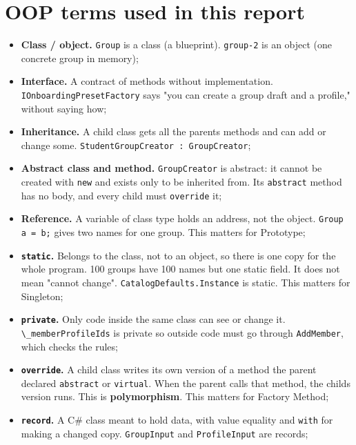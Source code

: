 \documentclass{utmreport}
\providecommand{\tightlist}{\setlength{\itemsep}{0pt}\setlength{\parskip}{0pt}}
\providecommand{\passthrough}[1]{#1}
\begin{document}
\section{OOP terms used in this report}

\begin{itemize}
\tightlist
\item \textbf{Class / object.} \passthrough{\lstinline!Group!} is a class (a blueprint). \passthrough{\lstinline!group-2!} is an object (one concrete group in memory);
\item \textbf{Interface.} A contract of methods without implementation. \passthrough{\lstinline!IOnboardingPresetFactory!} says "you can create a group draft and a profile," without saying how;
\item \textbf{Inheritance.} A child class gets all the parent\textquotesingle s methods and can add or change some. \passthrough{\lstinline!StudentGroupCreator : GroupCreator!};
\item \textbf{Abstract class and method.} \passthrough{\lstinline!GroupCreator!} is abstract: it cannot be created with \passthrough{\lstinline!new!} and exists only to be inherited from. Its \passthrough{\lstinline!abstract!} method has no body, and every child must \passthrough{\lstinline!override!} it;
\item \textbf{Reference.} A variable of class type holds an address, not the object. \passthrough{\lstinline!Group a = b;!} gives two names for one group. This matters for Prototype;
\item \textbf{\passthrough{\lstinline!static!}.} Belongs to the class, not to an object, so there is one copy for the whole program. 100 groups have 100 names but one static field. It does not mean "cannot change". \passthrough{\lstinline!CatalogDefaults.Instance!} is static. This matters for Singleton;
\item \textbf{\passthrough{\lstinline!private!}.} Only code inside the same class can see or change it. \passthrough{\lstinline!\_memberProfileIds!} is private so outside code must go through \passthrough{\lstinline!AddMember!}, which checks the rules;
\item \textbf{\passthrough{\lstinline!override!}.} A child class writes its own version of a method the parent declared \passthrough{\lstinline!abstract!} or \passthrough{\lstinline!virtual!}. When the parent calls that method, the child\textquotesingle s version runs. This is \textbf{polymorphism}. This matters for Factory Method;
\item \textbf{\passthrough{\lstinline!record!}.} A C\# class meant to hold data, with value equality and \passthrough{\lstinline!with!} for making a changed copy. \passthrough{\lstinline!GroupInput!} and \passthrough{\lstinline!ProfileInput!} are records;
\end{itemize}
\end{document}
